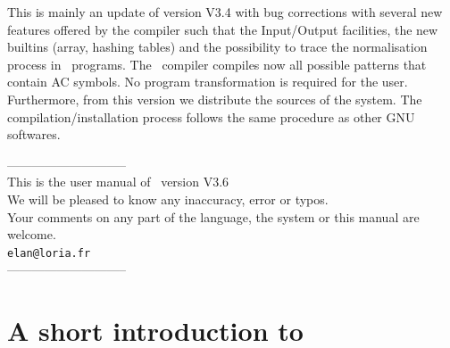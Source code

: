 \documentclass[11pt]{book}
\newcommand{\versionElan}{V3.6}
\newcommand{\elanVersion}{\versionElan}
\begin{document}
%
%
%  
%  
%
%

This is mainly an update of version {\sf V3.4} with bug corrections with several new features offered by the compiler such that the Input/Output facilities, the new builtins (array, hashing tables) and the possibility to trace the normalisation process in \elan\ programs.
The \elan\ compiler compiles now all possible patterns that contain AC symbols.
No program transformation is required for the user.
Furthermore, from this version we distribute the sources of the system.
The compilation/installation process follows the same procedure as other GNU softwares.

\vfill

\begin{center}
-----------------------------\\
This is the user manual of \elan\ version \elanVersion \\
We will be pleased to know any inaccuracy, error or typos.\\
Your comments on any part of the language, the system or this manual are welcome.\\
\mbox{\tt elan@loria.fr}\\
-----------------------------\\
\end{center}


\chapter{A short introduction to \elan}\label{short}

\end{document}
